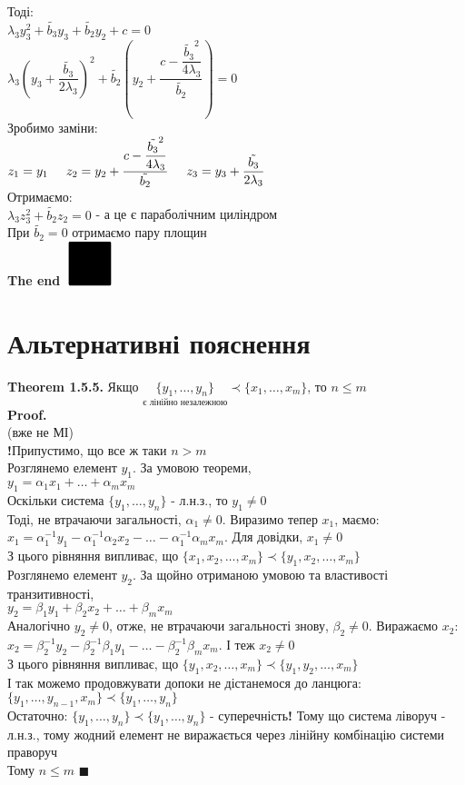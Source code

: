 \documentclass[a4paper, 14pt]{extarticle}
\def\th#1{\textbf{Theorem {#1}}}
\def\proof{\textbf{Proof.}\\}
\def\bigline{\vspace{5mm}\\}
\def\qed{$\blacksquare$}
\begin{document}
Тоді:\\
$\lambda_3 y_3^2 + \tilde{b_3} y_3 + \tilde{b_2} y_2 + c = 0$\\
$\lambda_3 \left(y_3 + \dfrac{\tilde{b_3}}{2 \lambda_3} \right)^2 + \tilde{b_2} \left(y_2 + \dfrac{c - \dfrac{\tilde{b_3}^2}{4\lambda_3}}{\tilde{b_2}} \right) = 0$\\
Зробимо заміни:\\
$z_1 = y_1 \hspace{0.5cm}
z_2 = y_2 + \dfrac{c - \dfrac{\tilde{b_3}^2}{4\lambda_3}}{\tilde{b_2}} \hspace{0.5cm}
z_3 = y_3 + \dfrac{\tilde{b_3}}{2 \lambda_3}
$\\
Отримаємо:\\
$\lambda_3 z_3^2 + \tilde{b_2} z_2 = 0$ - а це є параболічним циліндром\\
При $\tilde{b_2} = 0$ отримаємо пару площин
\bigline
\textbf{The end}
$\scaleobj{5}{\blacksquare}$\\
\newpage
\section{Альтернативні пояснення}
\th{1.5.5.} Якщо $\underset{\textrm{є лінійно незалежною}}{\{y_1, \dots, y_n \}} \prec \{x_1, \dots, x_m \}$, то $n \leq m$\\
\proof (вже не МІ)\\
\textbf{!}Припустимо, що все ж таки $n > m$\\
Розглянемо елемент $y_1$. За умовою теореми, \\
$y_1 = \alpha_1 x_1 + \dots + \alpha_m x_m$\\
Оскільки система $\{y_1,\dots,y_n\}$ - л.н.з., то $y_1 \neq 0$\\
Тоді, не втрачаючи загальності, $\alpha_1 \neq 0$. Виразимо тепер $x_1$, маємо:\\
$x_1 = \alpha_1^{-1}y_1 - \alpha_1^{-1}\alpha_2 x_2 - \dots - \alpha_1^{-1} \alpha_m x_m$. Для довідки, $x_1 \neq 0$\\
З цього рівняння випливає, що $\{x_1, x_2, \dots,x_m\} \prec \{y_1, x_2, \dots,x_m\}$\\
Розглянемо елемент $y_2$. За щойно отриманою умовою та властивості транзитивності, \\
$y_2 = \beta_1 y_1 + \beta_2 x_2 + \dots + \beta_m x_m$\\
Аналогічно $y_2 \neq 0$, отже, не втрачаючи загальності знову, $\beta_2 \neq 0$. Виражаємо $x_2$:\\
$x_2 = \beta_2^{-1}y_2 - \beta_2^{-1}\beta_1 y_1 - \dots - \beta_2^{-1} \beta_m x_m$. І теж $x_2 \neq 0$\\
З цього рівняння випливає, що $\{y_1,x_2,\dots,x_m\} \prec \{y_1,y_2,\dots,x_m\}$\\
І так можемо продовжувати допоки не дістанемося до ланцюга:\\ $\{y_1,\dots, y_{n-1}, x_m\} \prec \{y_1,\dots,y_n\}$\\
Остаточно: $\{y_1,\dots,y_n\} \prec \{y_1,\dots,y_n\}$ - суперечність\textbf{!} Тому що система ліворуч - л.н.з., тому жодний елемент не виражається через лінійну комбінацію системи праворуч\\
Тому $n \leq m$ \qed
\bigline
\end{document}
